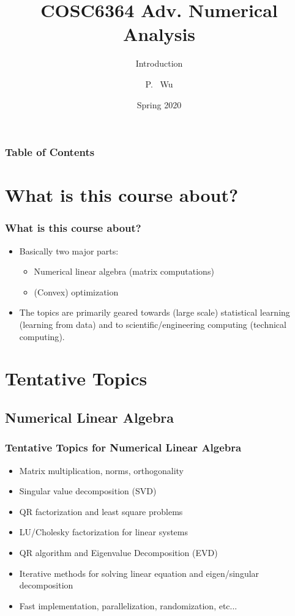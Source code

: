 \documentclass[10pt]{beamer}
\title[COSC6364 Adv. Numerical Analysis] %
{COSC6364 Adv. Numerical Analysis}
\subtitle{Introduction}
\author[Wu, Panruo] %
{P. ~Wu\inst{1}}
\institute[VFU] %
{
  \inst{1}%
  Computer Science\\
  University of Houston
}
\date[Spring 2020] %
{Spring 2020}
\begin{document}
\frame{\titlepage}

\begin{frame}
  \frametitle{Table of Contents}
  \tableofcontents
\end{frame}
\section{What is this course about?}
\begin{frame}
  \frametitle{What is this course about?}
  \begin{itemize}
    \item <2-> Basically two major parts:
    \begin{itemize}
      \item <3-> Numerical linear algebra (matrix computations)
      \item <4-> (Convex) optimization 
    \end{itemize}
    \item <5-> The topics are primarily geared towards (large scale) statistical learning (\alert{learning from data}) and to scientific/engineering computing (\alert{technical computing}).
  \end{itemize} 
\end{frame}

\section{Tentative Topics}
\subsection{Numerical Linear Algebra}
\begin{frame}
  \frametitle{Tentative Topics for Numerical Linear Algebra}
  \begin{itemize}
    \item <2-> Matrix multiplication, norms, orthogonality
    \item <3-> Singular value decomposition (SVD)
    \item <4-> QR factorization and least square problems
    \item <5-> LU/Cholesky factorization for linear systems
    \item <6-> QR algorithm and Eigenvalue Decomposition (EVD)
    \item <7-> Iterative methods for solving linear equation and eigen/singular decomposition
    \item <8-> Fast implementation, parallelization, randomization, etc...
  \end{itemize}
\end{frame}
\end{document}
